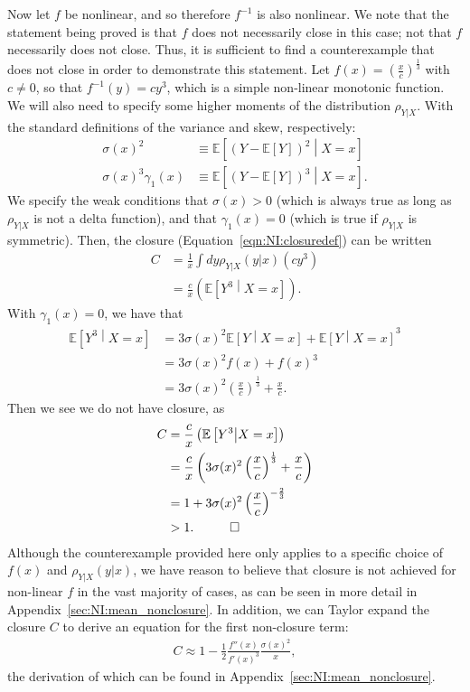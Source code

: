 Now let $f$ be nonlinear, and so therefore $f^{-1}$ is also nonlinear. We note that the statement being proved is that $f$ does not necessarily close in this case; not that $f$ necessarily does not close. Thus, it is sufficient to find a counterexample that does not close in order to demonstrate this statement. Let $f(x) = \left(\frac{x}{c}\right)^{\frac{1}{3}}$ with $c\ne 0$, so that $f^{-1}(y) = cy^3$, which is a simple non-linear monotonic function. We will also need to specify some higher moments of the distribution $\rho_{Y|X}$. With the standard definitions of the variance and skew, respectively:
\begin{align}
\sigma(x)^2&\equiv
\mathbb{E}\left[\left(Y-\mathbb{E}\left[Y\right]\right)^2\middle| X=x\right]\\
\sigma(x)^3\gamma_1(x) &\equiv \mathbb{E}\left[\left(Y-\mathbb{E}\left[Y\right]\right)^3\middle| X=x\right].
\end{align}
We specify the weak conditions that $\sigma(x) >0$ (which is always true as long as $\rho_{Y|X}$ is not a delta function), and that $\gamma_1(x)=0$ (which is true if $\rho_{Y|X}$ is symmetric).  Then, the closure (Equation~\ref{eqn:NI:closuredef}) can be written
\begin{align}
C &=\frac{1}{x} \int dy \rho_{Y|X}(y|x) \left(cy^3\right)\nonumber\\
&=\frac{c}{x} \left(\mathbb{E}\left[Y^3\middle| X=x\right]\right).
\end{align}
With $\gamma_1(x)=0$, we have that
\begin{align}
\mathbb{E}\left[Y^3\middle| X=x\right] &= 3\sigma(x)^2\mathbb{E}\left[Y\middle| X=x\right] + \mathbb{E}\left[Y\middle| X=x\right]^3\nonumber\\
&=3\sigma(x)^2f(x)+f(x)^3\nonumber\\
&=3\sigma(x)^2\left(\frac{x}{c}\right)^{\frac{1}{3}}+\frac{x}{c}.
\end{align}
Then we see we do not have closure, as
\begin{align}
C &=\frac{c}{x} \left(\mathbb{E}\left[Y^3\middle| X=x\right]\right)\nonumber\\
&=\frac{c}{x} \left(3\sigma(x)^2\left(\frac{x}{c}\right)^{\frac{1}{3}}+\frac{x}{c}\right)\nonumber\\
&= 1 + 3\sigma(x)^2\left(\frac{x}{c}\right)^{-\frac{2}{3}}\nonumber\\
&>1. \hspace{1 cm}\Box
\end{align}
Although the counterexample provided here only applies to a specific choice of $f(x)$ and $\rho_{Y|X}(y|x)$, we have reason to believe that closure is not achieved for non-linear $f$ in the vast majority of cases, as can be seen in more detail in Appendix~\ref{sec:NI:mean_nonclosure}. In addition, we can Taylor expand the closure $C$ to derive an equation for the first non-closure term:
\begin{align}
C \approx 1-\frac{1}{2}\frac{f''(x)}{f'(x)^3}\frac{\sigma(x)^2}{x},
\label{eqn:NI:closureseries_text}
\end{align}
the derivation of which can be found in Appendix~\ref{sec:NI:mean_nonclosure}.

